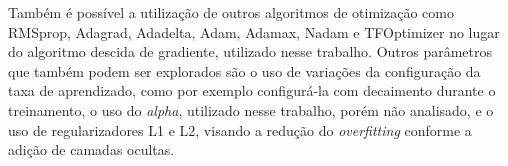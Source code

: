 \documentclass[12pt,oneside,a4paper,chapter=TITLE,section=TITLE,sumario
		=tradicional]{abntex2}
\begin{document}
		Também é possível a utilização de outros algoritmos de otimização como RMSprop, Adagrad, Adadelta, Adam, Adamax, Nadam e TFOptimizer no lugar do algoritmo descida de gradiente, utilizado nesse trabalho. Outros parâmetros que também podem ser explorados são o uso de variações da configuração da taxa de aprendizado, como por exemplo configurá-la com decaimento durante o treinamento, o uso do \textit{alpha}, utilizado nesse trabalho, porém não analisado, e o uso de regularizadores L1 e L2, visando a redução do \textit{overfitting} conforme a adição de camadas ocultas.
		
		
		
			
		
\end{document}

